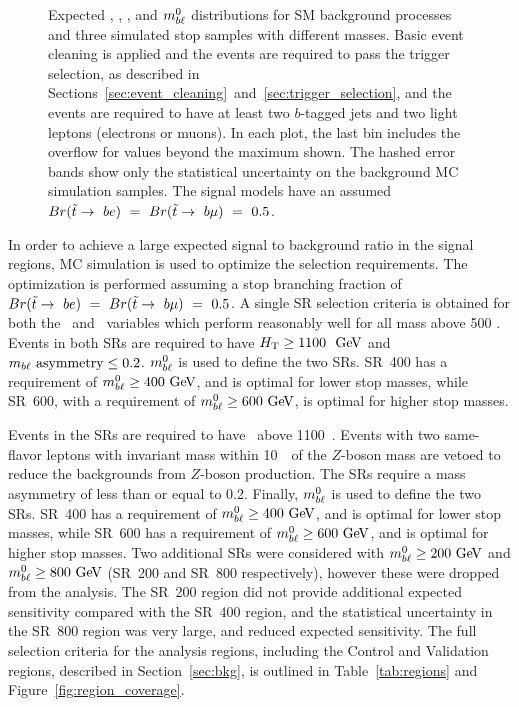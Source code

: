 \begin{figure}
{  }
  \caption{Expected \MLL, \HT, \MBLASYM, and $m_{b\ell}^0$ distributions for SM
    background processes and three simulated stop samples with different masses.
    Basic event cleaning is applied and the events are required to pass the
    trigger selection, as described in
    Sections~\ref{sec:event_cleaning}~and~\ref{sec:trigger_selection}, and the
    events are required to have at least two $b$-tagged jets and two light
    leptons (electrons or muons).
    In each plot, the last bin includes the overflow for values beyond the
    maximum shown. The hashed error bands show only the statistical
    uncertainty on the background MC simulation samples. The signal
    models have an assumed
    $Br(\tilde{t}\rightarrow~be)~=~Br(\tilde{t}\rightarrow~b\mu)~=~0.5$.
  }
  \label{fig:no_data__no_k__inclusive_flavor_all__kinematic_dists}
\end{figure}

In order to achieve a large expected signal to background ratio in the signal
regions, MC simulation is used to optimize the selection requirements.
The optimization is performed assuming a stop branching fraction of
$Br(\tilde{t}\rightarrow~be)~=~Br(\tilde{t}\rightarrow~b\mu)~=~0.5$.
A single SR selection criteria is obtained for both the \HT\ and
\MBLASYM\ variables which perform reasonably well for all mass above 500 \GeV.
Events in both SRs are required to have $\HT \geq 1100~\GeV$ and
$m_{b\ell}~\mathrm{asymmetry} \leq 0.2$.
$m_{b\ell}^0$ is used to define the two SRs.
SR~400 has a requirement of $\MBL^0 \geq 400 \GeV$, and is optimal for lower
stop masses, while SR~600, with a requirement of $\MBL^0 \geq 600 \GeV$, is
optimal for higher stop masses.

Events in the SRs are required to have \HT\ above 1100~\GeV.
Events with two same-flavor leptons with invariant mass within 10~\GeV\ of the
$Z$-boson mass are vetoed to reduce the backgrounds from $Z$-boson production.
The SRs require a mass asymmetry of less than or equal to 0.2.
Finally, $m_{b\ell}^0$ is used to define the two SRs.
SR~400 has a requirement of $\MBL^0 \geq 400 \GeV$, and is optimal for lower
stop masses, while SR~600 has a requirement of $\MBL^0 \geq 600 \GeV$, and is
optimal for higher stop masses.
Two additional SRs were considered with $\MBL^0 \geq 200 \GeV$ and
$\MBL^0 \geq 800 \GeV$ (SR~200 and SR~800 respectively), however these were
dropped from the analysis.
The SR~200 region did not provide additional expected sensitivity compared with
the SR~400 region, and the statistical uncertainty in the SR~800 region was very
large, and reduced expected sensitivity.
The full selection criteria for the analysis regions, including the Control and
Validation regions, described in Section~\ref{sec:bkg}, is outlined in
Table~\ref{tab:regions} and Figure~\ref{fig:region_coverage}.

